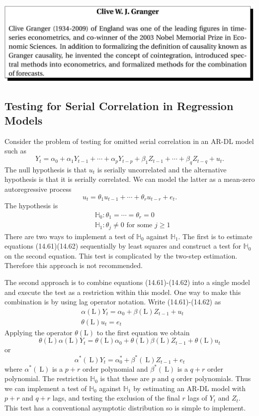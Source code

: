 \documentclass[10pt]{article}
\begin{document}
\includegraphics[max width=\textwidth]{2022_10_23_6047885e7d154c9f28afg-53(1)}

\subsection{Testing for Serial Correlation in Regression Models}
Consider the problem of testing for omitted serial correlation in an AR-DL model such as
$$
Y_{t}=\alpha_{0}+\alpha_{1} Y_{t-1}+\cdots+\alpha_{p} Y_{t-p}+\beta_{1} Z_{t-1}+\cdots+\beta_{q} Z_{t-q}+u_{t} .
$$
The null hypothesis is that $u_{t}$ is serially uncorrelated and the alternative hypothesis is that it is serially correlated. We can model the latter as a mean-zero autoregressive process
$$
u_{t}=\theta_{1} u_{t-1}+\cdots+\theta_{r} u_{t-r}+e_{t} .
$$
The hypothesis is
$$
\begin{aligned}
&\mathbb{H}_{0}: \theta_{1}=\cdots=\theta_{r}=0 \\
&\mathbb{H}_{1}: \theta_{j} \neq 0 \text { for some } j \geq 1
\end{aligned}
$$
There are two ways to implement a test of $\mathbb{H}_{0}$ against $\mathbb{H}_{1}$. The first is to estimate equations (14.61)(14.62) sequentially by least squares and construct a test for $\mathbb{H}_{0}$ on the second equation. This test is complicated by the two-step estimation. Therefore this approach is not recommended.

The second approach is to combine equations (14.61)-(14.62) into a single model and execute the test as a restriction within this model. One way to make this combination is by using lag operator notation. Write (14.61)-(14.62) as
$$
\begin{aligned}
&\alpha(\mathrm{L}) Y_{t}=\alpha_{0}+\beta(\mathrm{L}) Z_{t-1}+u_{t} \\
&\theta(\mathrm{L}) u_{t}=e_{t}
\end{aligned}
$$
Applying the operator $\theta(\mathrm{L})$ to the first equation we obtain
$$
\theta(\mathrm{L}) \alpha(\mathrm{L}) Y_{t}=\theta(\mathrm{L}) \alpha_{0}+\theta(\mathrm{L}) \beta(\mathrm{L}) Z_{t-1}+\theta(\mathrm{L}) u_{t}
$$
or
$$
\alpha^{*}(\mathrm{~L}) Y_{t}=\alpha_{0}^{*}+\beta^{*}(\mathrm{~L}) Z_{t-1}+e_{t}
$$
where $\alpha^{*}(\mathrm{~L})$ is a $p+r$ order polynomial and $\beta^{*}(\mathrm{~L})$ is a $q+r$ order polynomial. The restriction $\mathbb{H}_{0}$ is that these are $p$ and $q$ order polynomials. Thus we can implement a test of $\mathbb{H}_{0}$ against $\mathbb{H}_{1}$ by estimating an AR-DL model with $p+r$ and $q+r$ lags, and testing the exclusion of the final $r$ lags of $Y_{t}$ and $Z_{t}$. This test has a conventional asymptotic distribution so is simple to implement.
\end{document}
